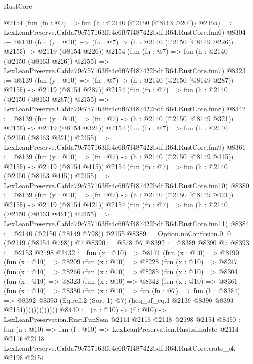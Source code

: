 \begin{lexlean}{RustCore}
\begin{coremodule}
    @2154
    (fun (fn : @7) =>
    fun (h : @2140 (@2150 (@8163 @204)) @2155) =>
    LexLeanPreserve.Cafda79c757163ffe4c6f07f487422bdf.R64.RustCore.fun6)
@8304 := @8139
    (fun (y : @10) => (fn : @7) -> (h : @2140 (@2150 (@8149 @226)) @2155) -> @2119 (@8154 @226))
    @2154
    (fun (fn : @7) =>
    fun (h : @2140 (@2150 (@8163 @226)) @2155) =>
    LexLeanPreserve.Cafda79c757163ffe4c6f07f487422bdf.R64.RustCore.fun7)
@8323 := @8139
    (fun (y : @10) => (fn : @7) -> (h : @2140 (@2150 (@8149 @287)) @2155) -> @2119 (@8154 @287))
    @2154
    (fun (fn : @7) =>
    fun (h : @2140 (@2150 (@8163 @287)) @2155) =>
    LexLeanPreserve.Cafda79c757163ffe4c6f07f487422bdf.R64.RustCore.fun8)
@8342 := @8139
    (fun (y : @10) => (fn : @7) -> (h : @2140 (@2150 (@8149 @321)) @2155) -> @2119 (@8154 @321))
    @2154
    (fun (fn : @7) =>
    fun (h : @2140 (@2150 (@8163 @321)) @2155) =>
    LexLeanPreserve.Cafda79c757163ffe4c6f07f487422bdf.R64.RustCore.fun9)
@8361 := @8139
    (fun (y : @10) => (fn : @7) -> (h : @2140 (@2150 (@8149 @415)) @2155) -> @2119 (@8154 @415))
    @2154
    (fun (fn : @7) =>
    fun (h : @2140 (@2150 (@8163 @415)) @2155) =>
    LexLeanPreserve.Cafda79c757163ffe4c6f07f487422bdf.R64.RustCore.fun10)
@8380 := @8139
    (fun (y : @10) => (fn : @7) -> (h : @2140 (@2150 (@8149 @421)) @2155) -> @2119 (@8154 @421))
    @2154
    (fun (fn : @7) =>
    fun (h : @2140 (@2150 (@8163 @421)) @2155) =>
    LexLeanPreserve.Cafda79c757163ffe4c6f07f487422bdf.R64.RustCore.fun11)
@8384 := @2140 (@2150 (@8149 @798)) @2155
@8389 := Option.noConfusion.{0, 0} (@2119 (@8154 @798)) @7
@8390 := @578 @7
@8392 := @8389 @8390 @7
@8393 := @2153 @2198
@8432 := fun (x : @10) =>
  @8171
    (fun (x : @10) =>
    @8190
      (fun (x : @10) =>
      @8209
        (fun (x : @10) =>
        @8228
          (fun (x : @10) =>
          @8247
            (fun (x : @10) =>
            @8266
              (fun (x : @10) =>
              @8285
                (fun (x : @10) =>
                @8304
                  (fun (x : @10) =>
                  @8323
                    (fun (x : @10) =>
                    @8342
                      (fun (x : @10) =>
                      @8361
                        (fun (x : @10) =>
                        @8380
                          (fun (x : @10) =>
                          fun (fn : @7) =>
                          fun (h : @8384) =>
                          @8392
                            @8393
                            (Eq.refl.{2} (Sort 1) @7)
                            (heq_of_eq.{1} @2139 @8390 @8393 @2154)))))))))))))
@8440 := (n : @10) -> (f : @10) -> LexLeanPreservation.Rust.FunSem @2114 @2116 @2118 @2198 @2154
@8450 := fun (n : @10) =>
  fun (f : @10) =>
  LexLeanPreservation.Rust.simulate
    @2114
    @2116
    @2118
    LexLeanPreserve.Cafda79c757163ffe4c6f07f487422bdf.R64.RustCore.crate_ok
    @2198
    @2154
\end{coremodule}
\end{lexlean}
